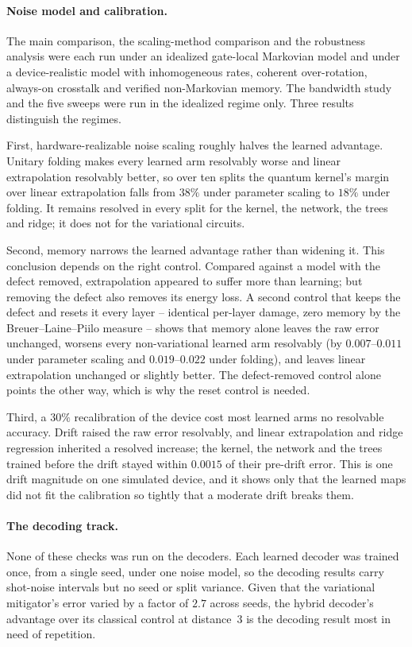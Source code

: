 \documentclass[Thesis.tex]{subfiles}
\begin{document}
\paragraph{Noise model and calibration.} The main comparison, the scaling-method comparison and the robustness analysis were
each run under an idealized gate-local Markovian model and under a device-realistic
model with inhomogeneous rates, coherent over-rotation, always-on crosstalk and
verified non-Markovian memory. The bandwidth study and the five sweeps were run in
the idealized regime only. Three results distinguish the regimes.

First, hardware-realizable noise scaling roughly halves the learned advantage.
Unitary folding makes every learned arm resolvably worse and linear extrapolation
resolvably better, so over ten splits the quantum kernel's margin over linear
extrapolation falls from $38\%$ under parameter scaling to $18\%$ under folding. It
remains resolved in every split for the kernel, the network, the trees and ridge;
it does not for the variational circuits.

Second, memory narrows the learned advantage rather than widening it. This
conclusion depends on the right control. Compared against a model with the defect
removed, extrapolation appeared to suffer more than learning; but removing the
defect also removes its energy loss. A second control that keeps the defect and
resets it every layer -- identical per-layer damage, zero memory by the
Breuer--Laine--Piilo measure -- shows that memory alone leaves the raw error
unchanged, worsens every non-variational learned arm resolvably (by $0.007$--$0.011$
under parameter scaling and $0.019$--$0.022$ under folding), and leaves linear
extrapolation unchanged or slightly better. The defect-removed control alone points
the other way, which is why the reset control is needed.

Third, a $30\%$ recalibration of the device cost most learned arms no resolvable
accuracy. Drift raised the raw error resolvably, and linear extrapolation and ridge
regression inherited a resolved increase; the kernel, the network and the trees
trained before the drift stayed within $0.0015$ of their pre-drift error. This is one
drift magnitude on one simulated device, and it shows only that the learned maps did
not fit the calibration so tightly that a moderate drift breaks them.

\paragraph{The decoding track.} None of these checks was run on the decoders. Each
learned decoder was trained once, from a single seed, under one noise model, so the
decoding results carry shot-noise intervals but no seed or split variance. Given that
the variational mitigator's error varied by a factor of $2.7$ across seeds, the
hybrid decoder's advantage over its classical control at distance~$3$ is the
decoding result most in need of repetition.
\end{document}

